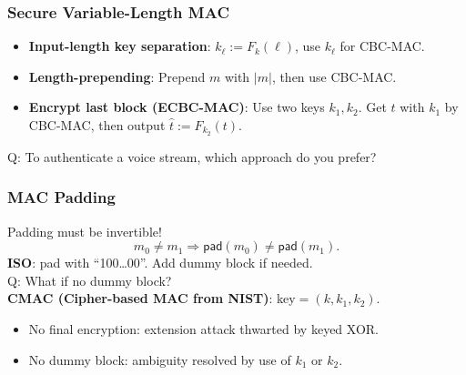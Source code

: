\begin{frame}\frametitle{Secure Variable-Length MAC}
\begin{itemize}
\item \textbf{Input-length key separation}: $k_{\ell} := F_k(\ell)$, use $k_{\ell}$ for CBC-MAC.
\item \textbf{Length-prepending}: Prepend $m$ with $|m|$, then use CBC-MAC.
\begin{figure}
\begin{center}

\end{center}
\end{figure}
\item \textbf{Encrypt last block (ECBC-MAC)}: Use two keys $k_1, k_2$. Get $t$ with $k_1$ by CBC-MAC, then output $\hat{t} := F_{k_2}(t)$.
\end{itemize}
\alert{Q: To authenticate a voice stream, which approach do you prefer?}
\end{frame}

\begin{frame}\frametitle{MAC Padding}
Padding must be invertible!\[ m_0\neq m_1 \Rightarrow \mathsf{pad}(m_0) \neq \mathsf{pad}(m_1). \]
\textbf{ISO}: pad with ``100\dots00''. Add dummy block if needed.\\
\alert{Q: What if no dummy block?} \\
\textbf{CMAC (Cipher-based MAC from NIST)}: key$=(k,k_1,k_2)$.
\begin{figure}
\begin{center}

\end{center}
\end{figure}
\begin{itemize}
\item No final encryption: extension attack thwarted by keyed XOR.
\item No dummy block: ambiguity resolved by use of $k_1$ or $k_2$.
\end{itemize}
\end{frame}
